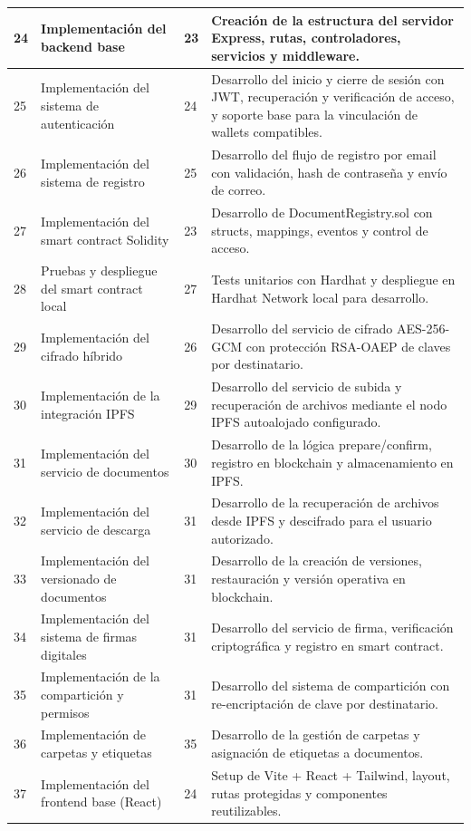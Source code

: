 \documentclass[11pt, a4paper]{article}
\begin{document}
\begin{longtable}{|p{1cm}|p{5.5cm}|p{1.5cm}|p{5.5cm}|}
\hline
24 & Implementación del backend base & 23 & Creación de la estructura del servidor Express, rutas, controladores, servicios y middleware. \\
\hline
25 & Implementación del sistema de autenticación & 24 & Desarrollo del inicio y cierre de sesión con JWT, recuperación y verificación de acceso, y soporte base para la vinculación de wallets compatibles. \\
\hline
26 & Implementación del sistema de registro & 25 & Desarrollo del flujo de registro por email con validación, hash de contraseña y envío de correo. \\
\hline
27 & Implementación del smart contract Solidity & 23 & Desarrollo de DocumentRegistry.sol con structs, mappings, eventos y control de acceso. \\
\hline
28 & Pruebas y despliegue del smart contract local & 27 & Tests unitarios con Hardhat y despliegue en Hardhat Network local para desarrollo. \\
\hline
29 & Implementación del cifrado híbrido & 26 & Desarrollo del servicio de cifrado AES-256-GCM con protección RSA-OAEP de claves por destinatario. \\
\hline
30 & Implementación de la integración IPFS & 29 & Desarrollo del servicio de subida y recuperación de archivos mediante el nodo IPFS autoalojado configurado. \\
\hline
31 & Implementación del servicio de documentos & 30 & Desarrollo de la lógica prepare/confirm, registro en blockchain y almacenamiento en IPFS. \\
\hline
32 & Implementación del servicio de descarga & 31 & Desarrollo de la recuperación de archivos desde IPFS y descifrado para el usuario autorizado. \\
\hline
33 & Implementación del versionado de documentos & 31 & Desarrollo de la creación de versiones, restauración y versión operativa en blockchain. \\
\hline
34 & Implementación del sistema de firmas digitales & 31 & Desarrollo del servicio de firma, verificación criptográfica y registro en smart contract. \\
\hline
35 & Implementación de la compartición y permisos & 31 & Desarrollo del sistema de compartición con re-encriptación de clave por destinatario. \\
\hline
36 & Implementación de carpetas y etiquetas & 35 & Desarrollo de la gestión de carpetas y asignación de etiquetas a documentos. \\
\hline
37 & Implementación del frontend base (React) & 24 & Setup de Vite + React + Tailwind, layout, rutas protegidas y componentes reutilizables. \\

\end{longtable}
\end{document}
